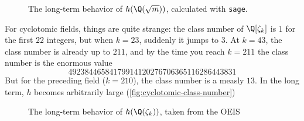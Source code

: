 \begin{figure}[h]
    \caption{The long-term behavior of $h(\Q(\sqrt{m}))$, calculated with \texttt{sage}.}
    \label{fig:real-quadratic-class-number}
\end{figure}

For cyclotomic fields, things are quite strange: the class number of $\Q[\zeta_k]$ is $1$ for the first $22$ integers, but when $k = 23$, suddenly it jumps to $3$. At $k = 43$, the class number is already up to $211$, and by the time you reach $k = 211$ the class number is the enormous value
$$
    49238446584179914120276706365116286443831
$$
But for the preceding field ($k = 210$), the class number is a measly $13$. In the long term, $h$ becomes arbitrarily large (\autoref{fig:cyclotomic-class-number})

\begin{figure}[h]
    \caption{The long-term behavior of $h(\Q(\zeta_k))$, taken from the OEIS \cite[A061653]{oeis}}
    \label{fig:cyclotomic-class-number}
\end{figure}

